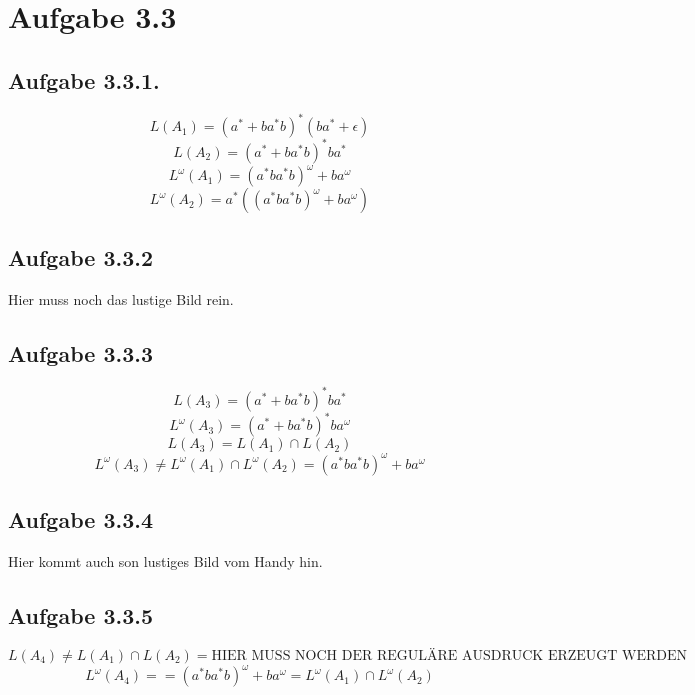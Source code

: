 \documentclass[10pt,a4paper]{article}
\author{Alina Bombeck, Pedram Mehdizadeh Taheri, Sebastian Döbel}
\title{}
\renewcommand{\o}{\omega}
\begin{document}
\section {Aufgabe 3.3}
\subsection {Aufgabe 3.3.1.}
\[L(A_1)=(a^* +ba^*b)^* (ba^*+\epsilon)\]
\[L(A_2)=(a^*+ba^*b)^* ba^* \]
\[L^\o(A_1) = (a^*ba^*b)^\o +ba^\o\]
\[L^\o(A_2) = a^*((a^*ba^*b)^\o + ba^\o) \]

\subsection{Aufgabe 3.3.2}
Hier muss noch das lustige Bild rein.

\subsection{Aufgabe 3.3.3}
\[L(A_3)=(a^*+ba^*b)^*ba^*\]
\[L^\o(A_3)=(a^*+ba^*b)^*ba^\o\]
\[L(A_3) = L(A_1)\cap L(A_2) \]
\[L^\o(A_3) \neq L^\o(A_1)\cap  L^\o(A_2) = (a^*ba^*b)^\o + ba^\o\] 

\subsection{Aufgabe 3.3.4}
Hier kommt auch son lustiges Bild vom Handy hin.

\subsection{Aufgabe 3.3.5}

\[L(A_4) \neq L(A_1)\cap L(A_2) = \text{HIER MUSS NOCH DER REGULÄRE AUSDRUCK ERZEUGT WERDEN}\]
\[L^\o(A_4) = = (a^*ba^*b)^\o + ba^\o = L^\o(A_1)\cap L^\o(A_2)\]
\end{document}

